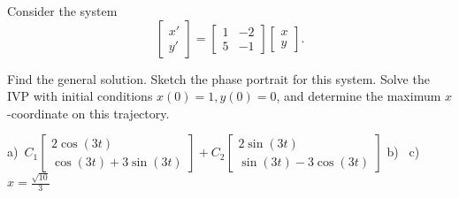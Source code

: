 \begin{exercise}
Consider the system
\begin{equation*}
\begin{bmatrix} x' \\ y' \end{bmatrix} = \begin{bmatrix} 1& -2 \\ 5 & -1 \end{bmatrix} \begin{bmatrix} x \\ y \end{bmatrix}.
\end{equation*} %
\begin{tasks}
\task Find the general solution.
\task Sketch the phase portrait for this system.
\task Solve the IVP with initial conditions $x(0)=1, y(0)=0$, and determine the maximum $x$-coordinate on this trajectory.
\end{tasks}
\end{exercise}
\comboSol{%
}
{%
a)~$C_1\left[\begin{smallmatrix} 2\cos(3t) \\ \cos(3t) + 3\sin(3t) \end{smallmatrix}\right] + C_2 \left[\begin{smallmatrix} 2\sin(3t) \\ \sin(3t) - 3\cos(3t) \end{smallmatrix}\right]$ \quad b)~ \hfill{}\hfill\hfill c)~$x = \frac{\sqrt{10}}{3}$
}

